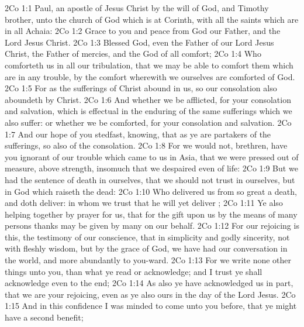 \vs 2Co 1:1 Paul, an apostle of Jesus Christ by the will of God, and Timothy  brother, unto the church of God which is at Corinth, with all the saints which are in all Achaia:
\vs 2Co 1:2 Grace  to you and peace from God our Father, and  the Lord Jesus Christ.
\vs 2Co 1:3 Blessed  God, even the Father of our Lord Jesus Christ, the Father of mercies, and the God of all comfort;
\vs 2Co 1:4 Who comforteth us in all our tribulation, that we may be able to comfort them which are in any trouble, by the comfort wherewith we ourselves are comforted of God.
\vs 2Co 1:5 For as the sufferings of Christ abound in us, so our consolation also aboundeth by Christ.
\vs 2Co 1:6 And whether we be afflicted,  for your consolation and salvation, which is effectual in the enduring of the same sufferings which we also suffer: or whether we be comforted,  for your consolation and salvation.
\vs 2Co 1:7 And our hope of you  stedfast, knowing, that as ye are partakers of the sufferings, so  also of the consolation.
\vs 2Co 1:8 For we would not, brethren, have you ignorant of our trouble which came to us in Asia, that we were pressed out of measure, above strength, insomuch that we despaired even of life:
\vs 2Co 1:9 But we had the sentence of death in ourselves, that we should not trust in ourselves, but in God which raiseth the dead:
\vs 2Co 1:10 Who delivered us from so great a death, and doth deliver: in whom we trust that he will yet deliver ;
\vs 2Co 1:11 Ye also helping together by prayer for us, that for the gift  upon us by the means of many persons thanks may be given by many on our behalf.
\vs 2Co 1:12 For our rejoicing is this, the testimony of our conscience, that in simplicity and godly sincerity, not with fleshly wisdom, but by the grace of God, we have had our conversation in the world, and more abundantly to you-ward.
\vs 2Co 1:13 For we write none other things unto you, than what ye read or acknowledge; and I trust ye shall acknowledge even to the end;
\vs 2Co 1:14 As also ye have acknowledged us in part, that we are your rejoicing, even as ye also  ours in the day of the Lord Jesus.
\vs 2Co 1:15 And in this confidence I was minded to come unto you before, that ye might have a second benefit;
